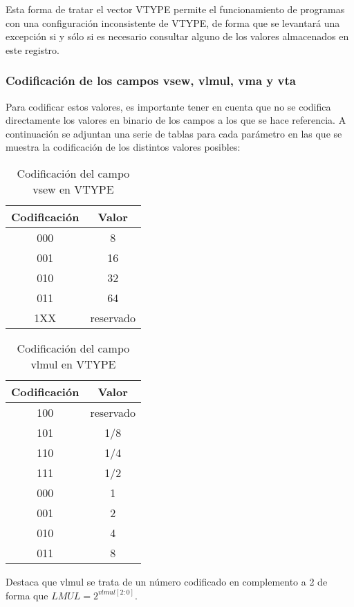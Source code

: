 Esta forma de tratar el vector VTYPE permite el funcionamiento de programas con una configuración inconsistente de VTYPE, de forma que se levantará una excepción si y sólo si es necesario consultar alguno de los valores almacenados en este registro.

\subsubsection{Codificación de los campos vsew, vlmul, vma y vta}

Para codificar estos valores, es importante tener en cuenta que no se codifica directamente los valores en binario de los campos a los que se hace referencia. A continuación se adjuntan una serie de tablas para cada parámetro en las que se muestra la codificación de los distintos valores posibles:

\begin{table}[H]
    \begin{tabular}{@{}cc@{}}
    \toprule
    Codificación & Valor\\
    \midrule
    000 & 8\\
    001 & 16\\
    010 & 32\\
    011 & 64\\
    1XX & reservado\\
    \bottomrule
    \end{tabular}
    \caption{Codificación del campo vsew en VTYPE}
\end{table}

\begin{table}[H]
    \begin{tabular}{@{}cc@{}}
    \toprule
    Codificación & Valor\\
    \midrule
    100 & reservado\\
    101 & 1/8\\
    110 & 1/4\\
    111 & 1/2\\
    000 & 1\\
    001 & 2\\
    010 & 4\\
    011 & 8\\
    \bottomrule
    \end{tabular}
    \caption{Codificación del campo vlmul en VTYPE}
\end{table}

Destaca que vlmul se trata de un número codificado en complemento a 2 de forma que $LMUL = 2^{vlmul[2:0]}$.


